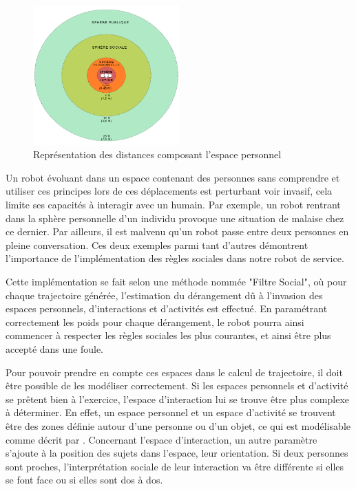 \begin{figure}[ht!]
    \centering
    \includegraphics[width=0.5\textwidth]{Rapport/images/distances_sociales.png}
    \caption{Représentation des distances composant l'espace personnel}
    \label{fig:distances}
\end{figure}

Un robot évoluant dans un espace contenant des personnes sans comprendre et utiliser ces principes lors de ces déplacements est perturbant voir invasif, cela limite ses capacités à interagir avec un humain. Par exemple, un robot rentrant dans la sphère personnelle d'un individu provoque une situation de malaise chez ce dernier. Par ailleurs, il est malvenu qu'un robot passe entre deux personnes en pleine conversation. Ces deux exemples parmi tant d'autres démontrent l'importance de l'implémentation des règles sociales dans notre robot de service.

Cette implémentation se fait selon une méthode nommée "Filtre Social", où pour chaque trajectoire générée, l'estimation du dérangement dû à l'invasion des espaces personnels, d'interactions et d'activités est effectué. En paramétrant correctement les poids pour chaque dérangement, le robot pourra ainsi commencer à respecter les règles sociales les plus courantes, et ainsi être plus accepté dans une foule.

Pour pouvoir prendre en compte ces espaces dans le calcul de trajectoire, il doit être possible de les modéliser correctement. Si les espaces personnels et d'activité se prêtent bien à l'exercice, l'espace d'interaction lui se trouve être plus complexe à déterminer. En effet, un espace personnel et un espace d'activité se trouvent être des zones définie autour d'une personne ou d'un objet, ce qui est modélisable comme décrit par \cite{spalanzani_contribution_2015}. Concernant l'espace d'interaction, un autre paramètre s'ajoute à la position des sujets dans l'espace, leur orientation. Si deux personnes sont proches, l'interprétation sociale de leur interaction va être différente si elles se font face ou si elles sont dos à dos.

